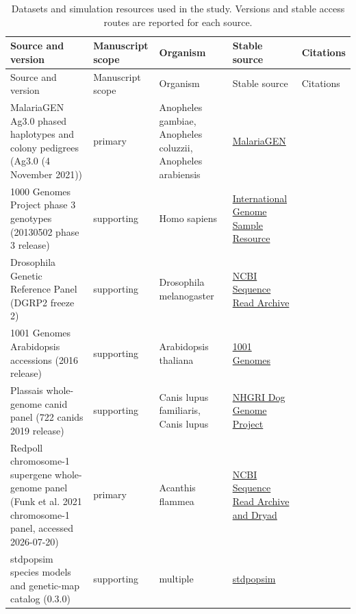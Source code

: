 \begin{longtable}{@{}p{}p{}p{}p{}p{}@{}}
\caption{Datasets and simulation resources used in the study. Versions and stable access routes are reported for each source.}\label{tab:data-sources}\\
\toprule Source and version & Manuscript scope & Organism & Stable source & Citations \\
\midrule\endfirsthead
\toprule Source and version & Manuscript scope & Organism & Stable source & Citations \\
\midrule\endhead
MalariaGEN Ag3.0 phased haplotypes and colony pedigrees (Ag3.0 (4 November 2021)) & primary & Anopheles gambiae, Anopheles coluzzii, Anopheles arabiensis & \href{https://malariagen.github.io/vector-data/ag3/ag3.0.html}{MalariaGEN} & \citep{malariagen_ag3_2021,ag1000g2020} \\
1000 Genomes Project phase 3 genotypes (20130502 phase 3 release) & supporting & Homo sapiens & \href{https://ftp.1000genomes.ebi.ac.uk/vol1/ftp/release/20130502/}{International Genome Sample Resource} & \citep{1000genomes2015} \\
Drosophila Genetic Reference Panel (DGRP2 freeze 2) & supporting & Drosophila melanogaster & \href{https://www.ncbi.nlm.nih.gov/sra?term=DGRP}{NCBI Sequence Read Archive} & \citep{mackay2012dgrp,huang2014dgrp} \\
1001 Genomes Arabidopsis accessions (2016 release) & supporting & Arabidopsis thaliana & \href{https://1001genomes.org/data/GMI-MPI/releases/v3.1/}{1001 Genomes} & \citep{genomes1001_2016,salome2012arabidopsis,rowan2019crossovers} \\
Plassais whole-genome canid panel (722 canids 2019 release) & supporting & Canis lupus familiaris, Canis lupus & \href{https://research.nhgri.nih.gov/dog_genome/downloads/datasets/WGS/722g.990.SNP.INDEL.chrAll.vcf.gz}{NHGRI Dog Genome Project} & \citep{plassais2019canids} \\
Redpoll chromosome-1 supergene whole-genome panel (Funk et al. 2021 chromosome-1 panel, accessed 2026-07-20) & primary & Acanthis flammea & \href{https://doi.org/10.5061/dryad.q83bk3jjm}{NCBI Sequence Read Archive and Dryad} & \citep{funk2021redpoll} \\
stdpopsim species models and genetic-map catalog (0.3.0) & supporting & multiple & \href{https://github.com/popsim-consortium/stdpopsim/releases/tag/0.3.0}{stdpopsim} & \citep{adrion2020stdpopsim} \\

\end{longtable}
